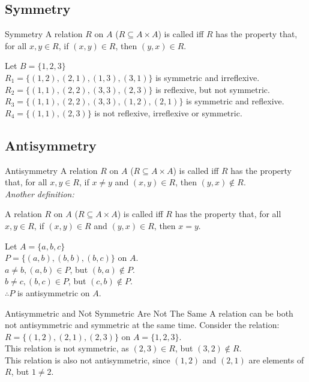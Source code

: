 \documentclass[\main/notes.tex]{subfiles}
\begin{document}
			\subsection{Symmetry}
				\begin{definition}{Symmetry}
					A relation $R$ on $A$ ($R \subseteq A \times A$) is called  iff $R$ has the property that, for all $x, y \in R$, if $(x, y) \in R$, then $(y, x) \in R$.
				\end{definition}
				\begin{example}[width=0.75\textwidth]
					Let $B = \{1, 2, 3\}$\\
					$R_{1} = \bigl\{(1, 2), (2, 1), (1, 3), (3, 1)\bigr\}$ is symmetric and irreflexive.\\
					$R_{2} = \bigl\{(1, 1), (2, 2), (3, 3), (2, 3)\bigr\}$ is reflexive, but not symmetric.\\
					$R_{3} = \bigl\{(1, 1), (2, 2), (3, 3), (1, 2), (2, 1)\bigr\}$ is symmetric and reflexive.\\
					$R_{4} = \bigl\{(1, 1), (2, 3)\bigr\}$ is not reflexive, irreflexive or symmetric.
				\end{example}
				\pagebreak
			\subsection{Antisymmetry}
				\begin{definition}{Antisymmetry}
					A relation $R$ on $A$ ($R \subseteq A \times A$) is called  iff $R$ has the property that, for all $x, y \in R$, if $x \neq y$ and $(x, y) \in R$, then $(y, x) \notin R$.\\
					\emph{Another definition:}
						\begin{indentparagraph}
							A relation $R$ on $A$ ($R \subseteq A \times A$) is called  iff $R$ has the property that, for all $x, y \in R$, if $(x, y) \in R$ and $(y, x) \in R$, then $x = y$.
						\end{indentparagraph}
				\end{definition}
				\begin{example}[width=0.36\textwidth]
					Let $A = \{a, b, c\}$\\
					$P = \bigl\{(a, b), (b, b), (b, c)\bigr\}$ on $A$.\\
					$a \neq b, (a, b) \in P$, but $(b, a) \notin P$.\\
					$b \neq c, (b, c) \in P$, but $(c, b) \notin P$.\\
					$\therefore P$ is antisymmetric on $A$.
				\end{example}
				\begin{sidenote}{Antisymmetric and Not Symmetric Are Not The Same}
					A relation can be both not antisymmetric and symmetric at the same time. Consider the relation:\\
					$R = \{(1, 2), (2, 1), (2, 3)\}$ on $A = \{1, 2, 3\}$.\\
					This relation is not symmetric, as $(2, 3) \in R$, but $(3, 2) \notin R$.\\
					This relation is also not antisymmetric, since $(1, 2)$ and $(2, 1)$ are elements of $R$, but $1 \neq 2$.
				\end{sidenote}
\end{document}
